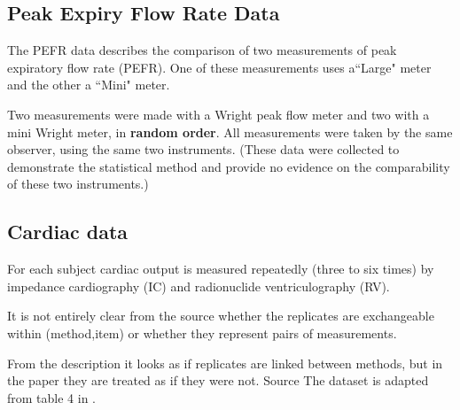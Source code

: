 \documentclass[12pt, a4paper]{report}
\theoremstyle{plain}
\theoremstyle{definition}
\theoremstyle{remark}
\begin{document}
\subsection{Peak Expiry Flow Rate Data}

The PEFR data describes the comparison of two measurements of peak
expiratory flow rate (PEFR). One of these measurements uses
a``Large" meter and the other a ``Mini" meter.

Two measurements were made with a Wright peak flow meter and two
with a mini Wright meter, in \textbf{random order}.  All
measurements were taken by the same observer, using the same two
instruments. (These data were collected to demonstrate the
statistical method and provide no evidence on the comparability of
these two instruments.)

\subsection{Cardiac data}

For each subject cardiac output is measured repeatedly (three to
six times) by impedance cardiography (IC) and radionuclide
ventriculography (RV).

It is not entirely clear from the source whether the replicates
are exchangeable within (method,item) or whether they represent
pairs of measurements.

From the description it looks as if replicates are linked between
methods, but in the paper they are treated as if they were not.
Source The dataset is adapted from table 4 in \citet{BA99}.

\end{document}
